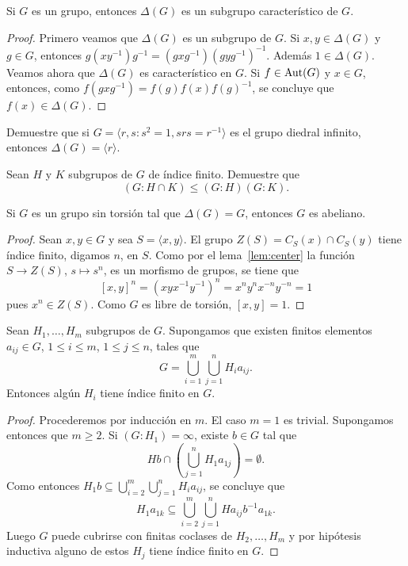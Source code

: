 \begin{lemma}
	Si $G$ es un grupo, entonces $\Delta(G)$ es un subgrupo característico de
	$G$.
\end{lemma}

\begin{proof}
	Primero veamos que $\Delta(G)$ es un subgrupo de $G$. Si $x,y\in\Delta(G)$
	y $g\in G$, entonces $g(xy^{-1})g^{-1}=(gxg^{-1})(gyg^{-1})^{-1}$. Además
	$1\in\Delta(G)$. Veamos ahora que $\Delta(G)$ es característico en $G$. Si
	$f\in\operatorname{Aut}(G)$ y $x\in G$, entonces, como $f(gxg^{-1})=f(g)f(x)f(g)^{-1}$,
	se concluye que $f(x)\in\Delta(G)$.
\end{proof}

\begin{exercise}
	Demuestre que si $G=\langle r,s:s^2=1,srs=r^{-1}\rangle$ es el grupo
	diedral infinito, entonces $\Delta(G)=\langle r\rangle$.
\end{exercise}

\begin{exercise}
	Sean $H$ y $K$ subgrupos de $G$ de índice finito. Demuestre que 
	\[
	(G:H\cap K)\leq (G:H)(G:K). 
	\]
\end{exercise}

\begin{lemma}
	\label{lem:FCabeliano}
	Si $G$ es un grupo sin torsión tal que $\Delta(G)=G$, entonces $G$ es
	abeliano.
\end{lemma}

\begin{proof}
	Sean $x,y\in G$ y sea $S=\langle x,y\rangle$. El grupo $Z(S)=C_S(x)\cap C_S(y)$ tiene
	índice finito, digamos $n$, en $S$. Como por el lema~\ref{lem:center} la
	función $S\to Z(S)$, $s\mapsto s^n$, es un morfismo de grupos, se tiene que 
	\[
		[x,y]^n=(xyx^{-1}y^{-1})^n=x^ny^nx^{-n}y^{-n}=1
	\]
	pues $x^n\in Z(S)$. Como $G$ es libre de torsión, $[x,y]=1$.
\end{proof}

\begin{lemma}[Neumann]
	\label{lem:Neumann}
	Sean $H_1,\dots,H_m$ subgrupos de $G$. Supongamos que existen finitos elementos 
	$a_{ij}\in G$, $1\leq i\leq m$, $1\leq j\leq n$, tales que 
	\[
		G=\bigcup_{i=1}^m\bigcup_{j=1}^n H_ia_{ij}.
	\]
	Entonces algún $H_i$ tiene índice finito en $G$.
\end{lemma}

\begin{proof}
	Procederemos por inducción en $m$. El caso $m=1$ es trivial. Supongamos
	entonces que $m\geq2$. Si $(G:H_1)=\infty$, existe $b\in G$ tal que 
	\[
		Hb\cap\left(
	\bigcup_{j=1}^nH_1a_{1j}\right)=\emptyset.
	\]
	Como entonces $H_1b\subseteq\bigcup_{i=2}^m\bigcup_{j=1}^n H_ia_{ij}$, se concluye que
	\[
		H_1a_{1k}\subseteq \bigcup_{i=2}^m\bigcup_{j=1}^n Ha_{ij}b^{-1}a_{1k}.
	\]
	Luego $G$ puede cubrirse con finitas coclases de $H_2,\dots,H_m$ y por hipótesis inductiva 
	alguno de estos $H_j$ tiene índice finito en $G$.
\end{proof}

